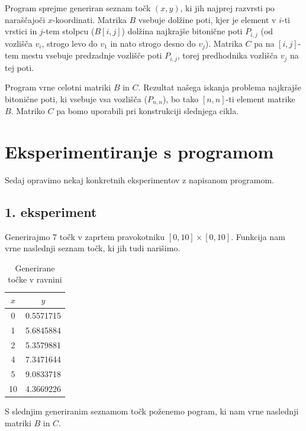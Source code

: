 \documentclass[12pt,a4paper]{amsart}
\theoremstyle{definition}
\theoremstyle{plain}
\begin{document}
\noindent
Program sprejme generiran seznam točk $(x,y)$, ki jih najprej razvrsti po naraščajoči $x$-koordinati. 
Matrika $B$ vsebuje dolžine poti, kjer je element v $i$-ti vrstici in $j$-tem stolpcu ($B[i,j]$) dolžina
najkrajše bitonične poti $P_{i,j}$ (od vozlišča $v_i$, strogo levo do $v_1$ in nato strogo desno do $v_j$).
Matrika $C$ pa na $[i,j]$-tem mestu vsebuje predzadnje vozlišče poti $P_{i,j}$, torej predhodnika vozlišča
$v_j$ na tej poti.
\newline

\noindent
Program vrne celotni matriki $B$ in $C$. Rezultat našega iskanja problema najkrajše bitonične poti, ki 
vsebuje vsa vozlišča ($P_{n,n}$), bo tako $[n,n]$-ti element matrike $B$. Matriko $C$ pa bomo uporabili pri
konstrukciji slednjega cikla.
\newline

\section{Eksperimentiranje s programom}

\noindent
Sedaj opravimo nekaj konkretnih eksperimentov z napisanom programom.
\newline

\subsection[]{1. eksperiment}
Generirajmo 7 točk v zaprtem pravokotniku $[0, 10] \times [0, 10].$ Funkcija nam vrne naslednji seznam točk,
ki jih tudi narišimo.

\begin{table}[h]
  \quad%
  \begin{tabular}{ |c| c| }
      \hline
   $x$ & $y$ \\ 
   \hline
   0 & 0.5571715 \\
   \hline  
   1 & 5.6845884 \\   
   \hline
   2 & 5.3579881 \\  
   \hline
   4 & 7.3471644 \\
   \hline
   5 & 9.0833718 \\  
   \hline
   10 & 4.3669226 \\  
   \hline 
  \end{tabular}
  \caption*{Generirane točke v ravnini}
\end{table}

\noindent
S slednjim generiranim seznamom točk poženemo pogram, ki nam vrne naslednji matriki $B$ in $C.$
\newline
\end{document}
